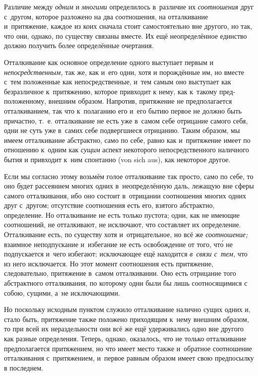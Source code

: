 
Различие между {\em одним} и {\em многими} определилось в~различие их
{\em соотношения} друг с~другом, которое разложено на два соотношения, на
отталкивание и~притяжение, каждое из коих сначала стоит самостоятельно вне
другого, но так, что они, однако, по существу связаны вместе. Их ещё
неопределённое единство должно получить более определённые очертания.

Отталкивание как основное определение одного выступает первым и
{\em непосредственным,} так же, как и~его одни, хотя и
порождённые им, но вместе с~тем положенные как непосредственные, и~тем
самым оно выступает как безразличное к~притяжению, которое привходит к
нему, как к~такому пред-положенному, внешним образом. Напротив, притяжение
не предполагается отталкиванием, так что к~полаганию его и~его бытию первое
не должно быть причастно, т.~е. отталкивание не есть уже в~самом себе
отрицание самого себя, одни не суть уже в~самих себе подвергшиеся
отрицанию. Таким образом, мы имеем отталкивание абстрактно, само по себе,
равно как и~притяжение имеет по отношению к~одним как
{\em сущим} аспект некоторого непосредственного наличного бытия и
привходит к~ним спонтанно (von sich aus), как некоторое другое.

Если мы согласно этому возьмём голое отталкивание так просто, само по себе,
то оно будет рассеянием многих одних в~неопределённую даль, лежащую вне
сферы самого отталкивания, ибо оно состоит в~отрицании соотношения многих
одних друг с~другом; отсутствие соотношения есть его, взятого абстрактно,
определение. Но отталкивание не есть только пустота; одни, как не имеющие
соотношений, не отталкивают, не исключают, что составляет их определение.
Отталкивание есть, по существу хотя и~отрицательное, но всё же
{\em соотношение;} взаимное неподпускание и~избегание
не есть освобождение от того, чт\'{о} не подпускается и~чего избегают;
исключающее ещё находится {\em в~связи с~тем,} что из
него исключается. Но этот момент соотношения есть притяжение,
следовательно, притяжение в~самом отталкивании. Оно есть отрицание того
абстрактного отталкивания, по которому одни были бы лишь соотносящимися с
собою, сущими, а~не исключающими.

Но поскольку исходным пунктом служило отталкивание налично сущих одних и,
стало быть, притяжение также положено приходящим к~нему внешним образом, то
при всей их нераздельности они всё же ещё удерживались одно вне другого как
разные определения. Теперь, однако, оказалось, что не только отталкивание
предполагается притяжением, но что имеет место также и~обратное соотношение
отталкивания с~притяжением, и~первое равным образом имеет свою предпосылку
в последнем.

